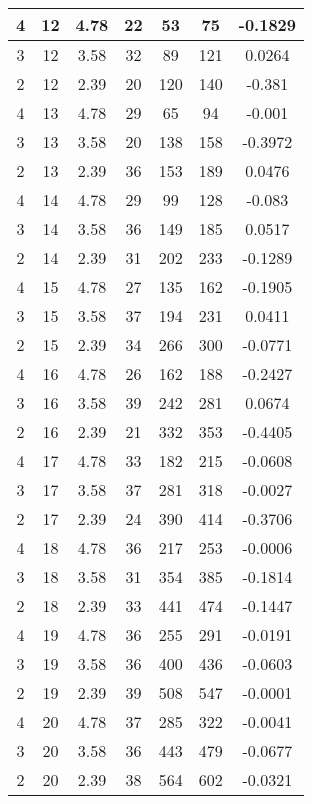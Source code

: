 \documentclass[letterpaper, 12pt]{article}
\begin{document}
\begin{longtable}{|c|c|c|c|c|c|c|}
\hline
4 & 12 & 4.78 & 22 & 53 & 75 & -0.1829 \\
\hline
3 & 12 & 3.58 & 32 & 89 & 121 & 0.0264 \\
\hline
2 & 12 & 2.39 & 20 & 120 & 140 & -0.381 \\
\hline
4 & 13 & 4.78 & 29 & 65 & 94 & -0.001 \\
\hline
3 & 13 & 3.58 & 20 & 138 & 158 & -0.3972 \\
\hline
2 & 13 & 2.39 & 36 & 153 & 189 & 0.0476 \\
\hline
4 & 14 & 4.78 & 29 & 99 & 128 & -0.083 \\
\hline
3 & 14 & 3.58 & 36 & 149 & 185 & 0.0517 \\
\hline
2 & 14 & 2.39 & 31 & 202 & 233 & -0.1289 \\
\hline
4 & 15 & 4.78 & 27 & 135 & 162 & -0.1905 \\
\hline
3 & 15 & 3.58 & 37 & 194 & 231 & 0.0411 \\
\hline
2 & 15 & 2.39 & 34 & 266 & 300 & -0.0771 \\
\hline
4 & 16 & 4.78 & 26 & 162 & 188 & -0.2427 \\
\hline
3 & 16 & 3.58 & 39 & 242 & 281 & 0.0674 \\
\hline
2 & 16 & 2.39 & 21 & 332 & 353 & -0.4405 \\
\hline
4 & 17 & 4.78 & 33 & 182 & 215 & -0.0608 \\
\hline
3 & 17 & 3.58 & 37 & 281 & 318 & -0.0027 \\
\hline
2 & 17 & 2.39 & 24 & 390 & 414 & -0.3706 \\
\hline
4 & 18 & 4.78 & 36 & 217 & 253 & -0.0006 \\
\hline
3 & 18 & 3.58 & 31 & 354 & 385 & -0.1814 \\
\hline
2 & 18 & 2.39 & 33 & 441 & 474 & -0.1447 \\
\hline
4 & 19 & 4.78 & 36 & 255 & 291 & -0.0191 \\
\hline
3 & 19 & 3.58 & 36 & 400 & 436 & -0.0603 \\
\hline
2 & 19 & 2.39 & 39 & 508 & 547 & -0.0001 \\
\hline
4 & 20 & 4.78 & 37 & 285 & 322 & -0.0041 \\
\hline
3 & 20 & 3.58 & 36 & 443 & 479 & -0.0677 \\
\hline
2 & 20 & 2.39 & 38 & 564 & 602 & -0.0321 \\
\hline
\end{longtable}
\end{document}
